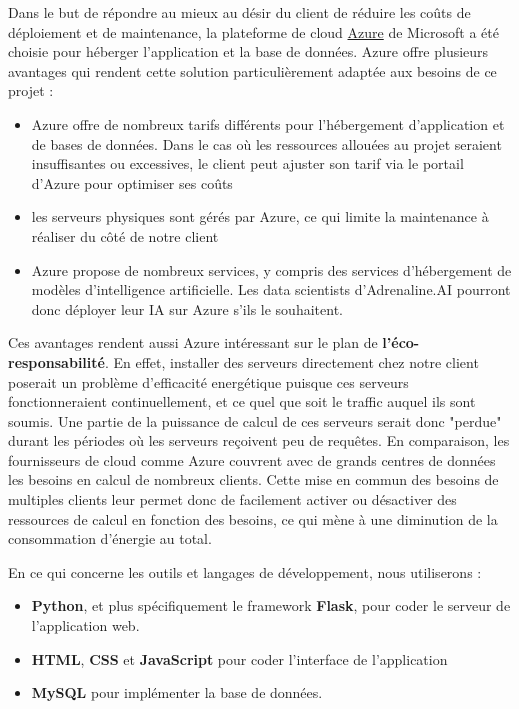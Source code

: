 \documentclass[french]{article}
\begin{document}
    Dans le but de répondre au mieux au désir du client de réduire les coûts de déploiement et de maintenance, la plateforme de cloud \href{https://azure.microsoft.com/fr-fr/}{Azure} de Microsoft a été choisie pour héberger l'application et la base de données. Azure offre plusieurs avantages qui rendent cette solution particulièrement adaptée aux besoins de ce projet :
    \begin{itemize}
        \item Azure offre de nombreux tarifs différents pour l'hébergement d'application et de bases de données. Dans le cas où les ressources allouées au projet seraient insuffisantes ou excessives, le client peut ajuster son tarif via le portail d'Azure pour optimiser ses coûts
        \item les serveurs physiques sont gérés par Azure, ce qui limite la maintenance à réaliser du côté de notre client
        \item Azure propose de nombreux services, y compris des services d'hébergement de modèles d'intelligence artificielle. Les data scientists d'Adrenaline.AI pourront donc déployer leur IA sur Azure s'ils le souhaitent.
    \end{itemize}

    Ces avantages rendent aussi Azure intéressant sur le plan de \textbf{l'éco-responsabilité}. En effet, installer des serveurs directement chez notre client poserait un problème d'efficacité energétique puisque ces serveurs fonctionneraient continuellement, et ce quel que soit le traffic auquel ils sont soumis. Une partie de la puissance de calcul de ces serveurs serait donc "perdue" durant les périodes où les serveurs reçoivent peu de requêtes. En comparaison, les fournisseurs de cloud comme Azure couvrent avec de grands centres de données les besoins en calcul de nombreux clients. Cette mise en commun des besoins de multiples clients leur permet donc de facilement activer ou désactiver des ressources de calcul en fonction des besoins, ce qui mène à une diminution de la consommation d'énergie au total.

    En ce qui concerne les outils et langages de développement, nous utiliserons :
    \begin{itemize}
        \item \textbf{Python}, et plus spécifiquement le framework \textbf{Flask}, pour coder le serveur de l'application web.
        \item \textbf{HTML}, \textbf{CSS} et \textbf{JavaScript} pour coder l'interface de l'application
        \item \textbf{MySQL} pour implémenter la base de données.
    \end{itemize}
\end{document}
